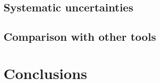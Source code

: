 \subsection{Systematic uncertainties}

\subsection{Comparison with other tools}


\section{Conclusions}
\label{sec:information_conclusions}
